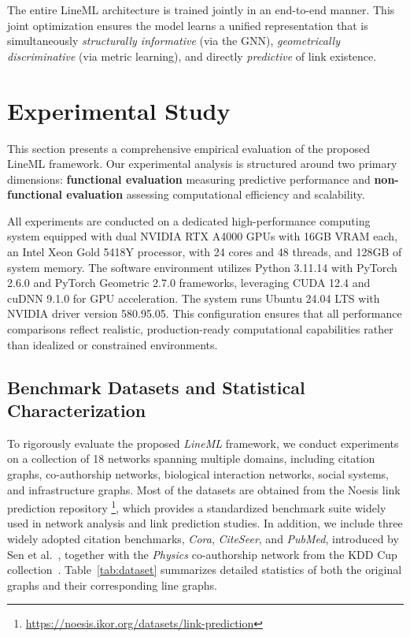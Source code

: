 \documentclass[pdflatex,sn-mathphys-num]{sn-jnl}%
\theoremstyle{thmstyleone}%
\theoremstyle{thmstyletwo}%
\theoremstyle{thmstylethree}%
\theoremstyle{plain} %
\theoremstyle{definition} %
\theoremstyle{remark} %
\theoremstyle{plain} %
\begin{document}
The entire LineML architecture is trained jointly in an end-to-end manner.  This joint optimization ensures the model learns a unified representation that is simultaneously \textit{structurally informative} (via the GNN), \textit{geometrically discriminative} (via metric learning), and directly \textit{predictive} of link existence.


\section{Experimental Study}
\label{sec:experiments}


This section presents a comprehensive empirical evaluation of the proposed LineML framework.
Our experimental analysis is structured around two primary dimensions: \textbf{functional evaluation} measuring predictive performance and \textbf{non-functional evaluation} assessing computational efficiency and scalability.

All experiments are conducted on a dedicated high-performance computing system equipped with dual NVIDIA RTX A4000 GPUs with 16GB VRAM each, an Intel Xeon Gold 5418Y processor, with 24 cores and 48 threads, and 128GB of system memory. 
The software environment utilizes Python 3.11.14 with PyTorch 2.6.0 and PyTorch Geometric 2.7.0 frameworks, leveraging CUDA 12.4 and cuDNN 9.1.0 for GPU acceleration. 
The system runs Ubuntu 24.04 LTS with NVIDIA driver version 580.95.05. 
This configuration ensures that all performance comparisons reflect realistic, production-ready computational capabilities rather than idealized or constrained environments.


\subsection{Benchmark Datasets and Statistical Characterization}
\label{sec:5.1}

To rigorously evaluate the proposed \textit{LineML} framework, we conduct experiments on a collection of 18 networks spanning multiple domains, including citation graphs, co-authorship networks, biological interaction networks, social systems, and infrastructure graphs. 
Most of the datasets are obtained from the Noesis link prediction repository \cite{watts1998collective,newman2001structure}\footnote{\url{https://noesis.ikor.org/datasets/link-prediction}}, which provides a standardized benchmark suite widely used in network analysis and link prediction studies.
In addition, we include three widely adopted citation benchmarks, \textit{Cora}, \textit{CiteSeer}, and \textit{PubMed}, introduced by Sen et al.~\cite{sen2008collective}, together with the \textit{Physics} co-authorship network from the KDD Cup collection~\cite{gehrke2003overview}. 
Table~\ref{tab:dataset} summarizes detailed statistics of both the original graphs and their corresponding line graphs.
\end{document}
